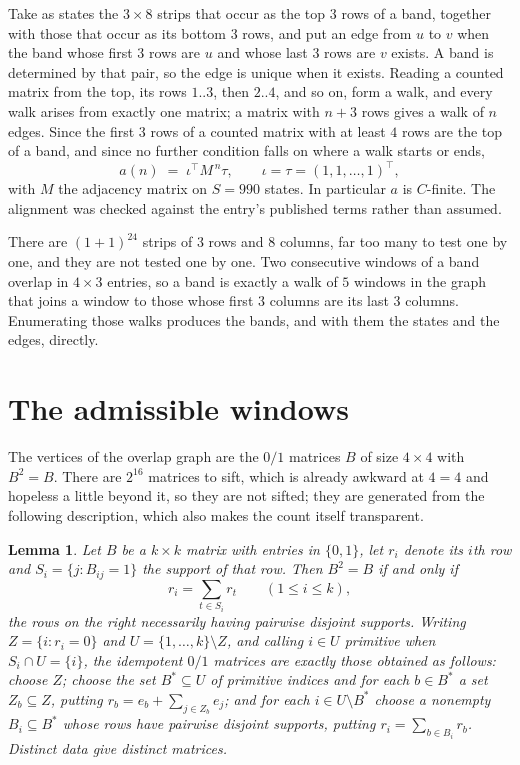 \documentclass[11pt,a4paper]{article}
\theoremstyle{plain}
\newtheorem{lemma}[theorem]{Lemma}
\theoremstyle{definition}
\begin{document}
Take as states the $3\times8$ strips that occur as the top $3$ rows of a band,
together with those that occur as its bottom $3$ rows, and put an edge from $u$ to $v$
when the band whose first $3$ rows are $u$ and whose last $3$ rows are $v$ exists.
A band is determined by that pair, so the edge is unique when it exists. Reading a counted
matrix from the top, its rows $1..3$, then $2..4$, and so on, form a walk, and every
walk arises from exactly one matrix; a matrix with $n+3$ rows gives a walk of $n$ edges.
Since the first $3$ rows of a counted matrix with at least $4$ rows are the top of a
band, and since no further condition falls on where a walk starts or ends,
\[
a(n)\;=\;\iota^{\!\top}M^{\,n}\tau ,\qquad \iota=\tau=(1,1,\dots,1)^{\!\top},
\]
with $M$ the adjacency matrix on $S=990$ states. In particular $a$ is $C$-finite. The
alignment was checked against the entry's published terms rather than assumed.

There are $(1 + 1)^{24}$ strips of $3$ rows and $8$ columns, far too
many to test one by one, and they are not tested one by one. Two consecutive windows of a band
overlap in $4\times3$ entries, so a band is exactly a walk of $5$ windows in
the graph that joins a window to those whose first $3$ columns are its last $3$
columns. Enumerating those walks produces the bands, and with them the states and the edges,
directly.

\section{The admissible windows}

The vertices of the overlap graph are the $0/1$ matrices $B$ of size $4\times4$ with
$B^2=B$. There are $2^{16}$ matrices to sift, which is already awkward at $4=4$ and
hopeless a little beyond it, so they are not sifted; they are generated from the following
description, which also makes the count itself transparent.

\begin{lemma}\label{lem:idem}
Let $B$ be a $k\times k$ matrix with entries in $\{0,1\}$, let $r_i$ denote its $i$th row and
$S_i=\{j:B_{ij}=1\}$ the support of that row. Then $B^2=B$ if and only if
\[
r_i=\sum_{t\in S_i}r_t \qquad (1\le i\le k),
\]
the rows on the right necessarily having pairwise disjoint supports. Writing
$Z=\{i:r_i=0\}$ and $U=\{1,\dots,k\}\setminus Z$, and calling $i\in U$ \emph{primitive}
when $S_i\cap U=\{i\}$, the idempotent $0/1$ matrices are exactly those obtained as follows:
choose $Z$; choose the set $B^{\ast}\subseteq U$ of primitive indices and for each
$b\in B^{\ast}$ a set $Z_b\subseteq Z$, putting $r_b=e_b+\sum_{j\in Z_b}e_j$; and for each
$i\in U\setminus B^{\ast}$ choose a nonempty $B_i\subseteq B^{\ast}$ whose rows have
pairwise disjoint supports, putting $r_i=\sum_{b\in B_i}r_b$. Distinct data give distinct
matrices.
\end{lemma}
\end{document}
